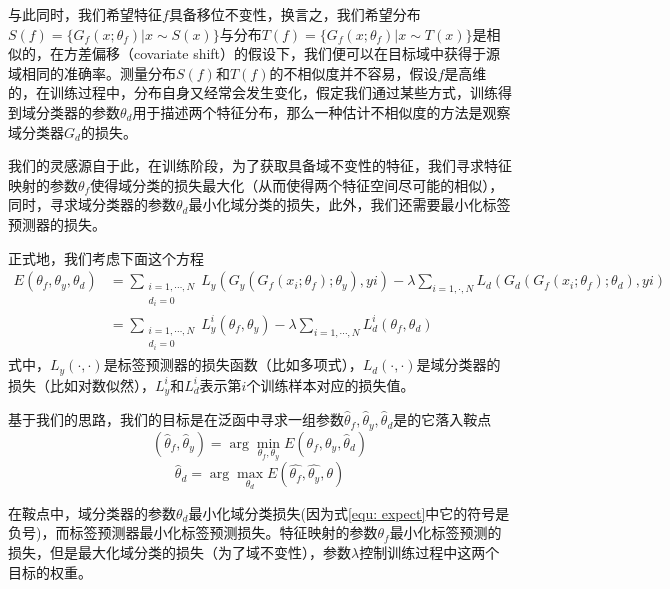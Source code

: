 \documentclass[UTF8]{ctexart}
\begin{document}
与此同时，我们希望特征$f$具备移位不变性，换言之，我们希望分布$S(f) = \{G_f(x;\theta_f)|x\sim S(x)\}$与分布$T(f) = \{G_f(x;\theta_f)|x\sim T(x)\}$是相似的，在方差偏移（covariate shift）的假设下，我们便可以在目标域中获得于源域相同的准确率。测量分布$S(f)$和$T(f)$的不相似度并不容易，假设$f$是高维的，在训练过程中，分布自身又经常会发生变化，假定我们通过某些方式，训练得到域分类器的参数$\theta_d$用于描述两个特征分布，那么一种估计不相似度的方法是观察域分类器$G_d$的损失。

我们的灵感源自于此，在训练阶段，为了获取具备域不变性的特征，我们寻求特征映射的参数$\theta_f$使得域分类的损失最大化（从而使得两个特征空间尽可能的相似），同时，寻求域分类器的参数$\theta_d$最小化域分类的损失，此外，我们还需要最小化标签预测器的损失。

正式地，我们考虑下面这个方程
\begin{equation}
\begin{split}
E(\theta_f, \theta_y, \theta_d)  &= \sum\limits_{\substack{i=1, \cdots, N\\  d_i=0}}L_y(G_y(G_f(x_i;\theta_f);\theta_y),yi) 
- \lambda\sum\limits_{i=1, \cdot, N}L_d(G_d(G_f(x_i; \theta_f); \theta_d), yi)     \\
&= \sum\limits_{\substack{i=1, \cdots, N\\  d_i=0}}L_y^i(\theta_f, \theta_y) - \lambda\sum\limits_{i=1, \cdots, N}L_d^i(\theta_f, \theta_d)
\end{split}
\label{equ: expect}
\end{equation}
式中，$L_y(\cdot, \cdot)$是标签预测器的损失函数（比如多项式），$L_d(\cdot, \cdot)$是域分类器的损失（比如对数似然），$L_y^i$和$L_d^i$表示第$i$个训练样本对应的损失值。

基于我们的思路，我们的目标是在泛函中寻求一组参数$\hat{\theta}_f, \hat{\theta}_y, \hat{\theta}_d$是的它落入鞍点
\begin{equation}
(\hat{\theta}_f, \hat{\theta}_y) = \arg \min\limits_{\theta_f, \theta_y}E(\theta_f, \theta_y, \hat{\theta}_d)
\label{equ:saddle point f and y}
\end{equation}
\begin{equation}
\hat{\theta}_d = \arg \max\limits_{\theta_d}E(\hat{\theta_f}, \hat{\theta_y}, \theta)
\label{equ:saddle point d}
\end{equation}

在鞍点中，域分类器的参数$\theta_d$最小化域分类损失(因为式\eqref{equ: expect}中它的符号是负号)，而标签预测器最小化标签预测损失。特征映射的参数$\theta_f$最小化标签预测的损失，但是最大化域分类的损失（为了域不变性），参数$\lambda$控制训练过程中这两个目标的权重。
\end{document}
